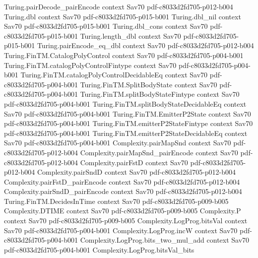 \begin{theorem}
\proofstep
  {Turing.pairDecode_pairEncode}
  {context}
  {Sav70}
  {pdf-c8033d2fd705-p012-b004}
\proofstep
  {Turing.dbl}
  {context}
  {Sav70}
  {pdf-c8033d2fd705-p015-b001}
\proofstep
  {Turing.dbl_nil}
  {context}
  {Sav70}
  {pdf-c8033d2fd705-p015-b001}
\proofstep
  {Turing.dbl_cons}
  {context}
  {Sav70}
  {pdf-c8033d2fd705-p015-b001}
\proofstep
  {Turing.length_dbl}
  {context}
  {Sav70}
  {pdf-c8033d2fd705-p015-b001}
\proofstep
  {Turing.pairEncode_eq_dbl}
  {context}
  {Sav70}
  {pdf-c8033d2fd705-p012-b004}
\proofstep
  {Turing.FinTM.CatalogPolyControl}
  {context}
  {Sav70}
  {pdf-c8033d2fd705-p004-b001}
\proofstep
  {Turing.FinTM.catalogPolyControlFintype}
  {context}
  {Sav70}
  {pdf-c8033d2fd705-p004-b001}
\proofstep
  {Turing.FinTM.catalogPolyControlDecidableEq}
  {context}
  {Sav70}
  {pdf-c8033d2fd705-p004-b001}
\proofstep
  {Turing.FinTM.SplitBodyState}
  {context}
  {Sav70}
  {pdf-c8033d2fd705-p004-b001}
\proofstep
  {Turing.FinTM.splitBodyStateFintype}
  {context}
  {Sav70}
  {pdf-c8033d2fd705-p004-b001}
\proofstep
  {Turing.FinTM.splitBodyStateDecidableEq}
  {context}
  {Sav70}
  {pdf-c8033d2fd705-p004-b001}
\proofstep
  {Turing.FinTM.EmitterP2State}
  {context}
  {Sav70}
  {pdf-c8033d2fd705-p004-b001}
\proofstep
  {Turing.FinTM.emitterP2StateFintype}
  {context}
  {Sav70}
  {pdf-c8033d2fd705-p004-b001}
\proofstep
  {Turing.FinTM.emitterP2StateDecidableEq}
  {context}
  {Sav70}
  {pdf-c8033d2fd705-p004-b001}
\proofstep
  {Complexity.pairMapSnd}
  {context}
  {Sav70}
  {pdf-c8033d2fd705-p012-b004}
\proofstep
  {Complexity.pairMapSnd_pairEncode}
  {context}
  {Sav70}
  {pdf-c8033d2fd705-p012-b004}
\proofstep
  {Complexity.pairFstD}
  {context}
  {Sav70}
  {pdf-c8033d2fd705-p012-b004}
\proofstep
  {Complexity.pairSndD}
  {context}
  {Sav70}
  {pdf-c8033d2fd705-p012-b004}
\proofstep
  {Complexity.pairFstD_pairEncode}
  {context}
  {Sav70}
  {pdf-c8033d2fd705-p012-b004}
\proofstep
  {Complexity.pairSndD_pairEncode}
  {context}
  {Sav70}
  {pdf-c8033d2fd705-p012-b004}
\proofstep
  {Turing.FinTM.DecidesInTime}
  {context}
  {Sav70}
  {pdf-c8033d2fd705-p009-b005}
\proofstep
  {Complexity.DTIME}
  {context}
  {Sav70}
  {pdf-c8033d2fd705-p009-b005}
\proofstep
  {Complexity.P}
  {context}
  {Sav70}
  {pdf-c8033d2fd705-p009-b005}
\proofstep
  {Complexity.LogProg.bitsVal}
  {context}
  {Sav70}
  {pdf-c8033d2fd705-p004-b001}
\proofstep
  {Complexity.LogProg.incW}
  {context}
  {Sav70}
  {pdf-c8033d2fd705-p004-b001}
\proofstep
  {Complexity.LogProg.bits_two_mul_add}
  {context}
  {Sav70}
  {pdf-c8033d2fd705-p004-b001}
\proofstep
  {Complexity.LogProg.bitsVal_bits}

\end{theorem}
